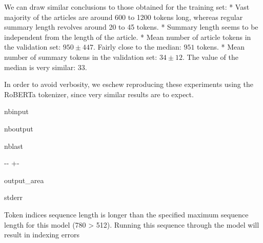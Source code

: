 \documentclass[letterpaper,10pt,english]{sphinxmanual}
\newlength\nbsphinxcodecellspacing
\begin{document}
\sphinxAtStartPar
We can draw similar conclusions to those obtained for the training set: * Vast majority of the articles are around 600 to 1200 tokens long, whereas regular summary length revolves around 20 to 45 tokens. * Summary length seems to be independent from the length of the article. * Mean number of article tokens in the validation set: \(950\pm447\). Fairly close to the median: \(951\) tokens. * Mean number of summary tokens in the validation set: \(34\pm12\). The value of the median
is very similar: \(33\).

\sphinxAtStartPar
In order to avoid verbosity, we eschew reproducing these experiments using the RoBERTa tokenizer, since very similar results are to expect.

\begin{sphinxuseclass}{nbinput}
{
\begin{sphinxVerbatim}[commandchars=\\\{\}]
\llap{\color{nbsphinxin}[55]:\,\hspace{\fboxrule}\hspace{\fboxsep}}   
   
\end{sphinxVerbatim}
}

\end{sphinxuseclass}
\begin{sphinxuseclass}{nboutput}
\begin{sphinxuseclass}{nblast}
{

\kern-\sphinxverbatimsmallskipamount\kern-\baselineskip
\kern+\FrameHeightAdjust\kern-\fboxrule
\vspace{\nbsphinxcodecellspacing}

\begin{sphinxuseclass}{output_area}
\begin{sphinxuseclass}{stderr}


\begin{sphinxVerbatim}[commandchars=\\\{\}]
Token indices sequence length is longer than the specified maximum sequence length for this model (780 > 512). Running this sequence through the model will result in indexing errors
\end{sphinxVerbatim}



\end{sphinxuseclass}
\end{sphinxuseclass}
}

\end{sphinxuseclass}
\end{sphinxuseclass}
\end{document}
